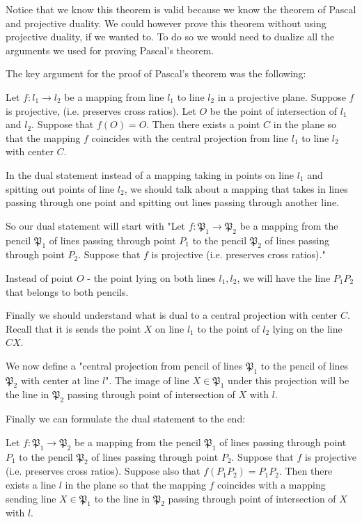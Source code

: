 Notice that we know this theorem is valid because we know the theorem of Pascal and projective duality. We could however prove this theorem without using projective duality, if we wanted to. To do so we would need to dualize all the arguments we used for proving Pascal's theorem.

The key argument for the proof of Pascal's theorem was the following:

Let $f:l_1\to l_2$ be a mapping from line $l_1$ to line $l_2$ in a projective plane. Suppose $f$ is projective, (i.e. preserves cross ratios). Let $O$ be the point of intersection of $l_1$ and $l_2$. Suppose that $f(O)=O$. Then there exists a point $C$ in the plane so that the mapping $f$ coincides with the central projection from line $l_1$ to line $l_2$ with center $C$.

In the dual statement instead of a mapping taking in points on line $l_1$ and spitting out points of line $l_2$, we should talk about a mapping that takes in lines passing through one point and spitting out lines passing through another line.

So our dual statement will start with "Let $f:\mathfrak{P}_1\to \mathfrak{P}_2$ be a mapping from the pencil $\mathfrak{P}_1$ of lines passing through point $P_1$ to the pencil $\mathfrak{P}_2$ of lines passing through point $P_2$. Suppose that $f$ is projective (i.e. preserves cross ratios)."

Instead of point $O$ - the point lying on both lines $l_1,l_2$, we will have the line $P_1P_2$ that belongs to both pencils.

Finally we should understand what is dual to a central projection with center $C$. Recall that it is sends the point $X$ on line $l_1$ to the point of $l_2$ lying on the line $CX$.

We now define a "central projection from pencil of lines $\mathfrak{P}_1$ to the pencil of lines $\mathfrak{P}_2$ with center at line $l$". The image of line $X\in \mathfrak{P}_1$ under this projection will be the line in $\mathfrak{P}_2$ passing through point of intersection of $X$ with $l$.

Finally we can formulate the dual statement to the end:

Let $f:\mathfrak{P}_1\to \mathfrak{P}_2$ be a mapping from the pencil $\mathfrak{P}_1$ of lines passing through point $P_1$ to the pencil $\mathfrak{P}_2$ of lines passing through point $P_2$. Suppose that $f$ is projective (i.e. preserves cross ratios). Suppose also that $f(P_1P_2)=P_1P_2$. Then there exists a line $l$ in the plane so that the mapping $f$ coincides with a mapping sending line $X\in \mathfrak{P}_1$ to the line in $\mathfrak{P}_2$ passing through point of intersection of $X$ with $l$.

